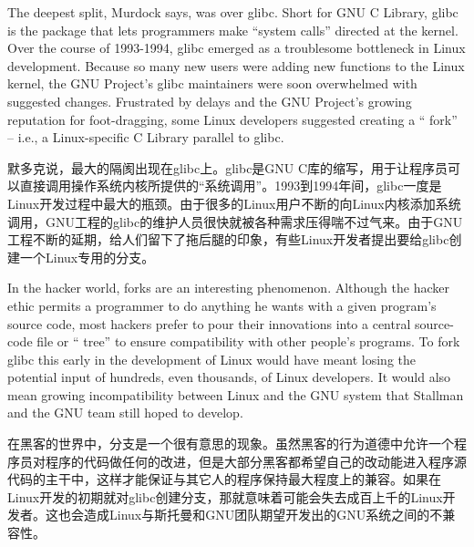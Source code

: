 
\ifdefined\eng
The deepest split, Murdock says, was over glibc. Short for GNU C Library, glibc is the package that lets programmers make ``system calls'' directed at the kernel. Over the course of 1993-1994, glibc emerged as a troublesome bottleneck in Linux development. Because so many new users were adding new functions to the Linux kernel, the GNU Project's glibc maintainers were soon overwhelmed with suggested changes. Frustrated by delays and the GNU Project's growing reputation for foot-dragging, some Linux developers suggested creating a `` fork'' -- i.e., a Linux-specific C Library parallel to glibc.
\fi

\ifdefined\chs
默多克说，最大的隔阂出现在glibc上。glibc是GNU C库的缩写，用于让程序员可以直接调用操作系统内核所提供的``系统调用''。1993到1994年间，glibc一度是Linux开发过程中最大的瓶颈。由于很多的Linux用户不断的向Linux内核添加系统调用，GNU工程的glibc的维护人员很快就被各种需求压得喘不过气来。由于GNU工程不断的延期，给人们留下了拖后腿的印象，有些Linux开发者提出要给glibc创建一个Linux专用的分支。
\fi

\ifdefined\eng
In the hacker world, forks are an interesting phenomenon. Although the hacker ethic permits a programmer to do anything he wants with a given program's source code, most hackers prefer to pour their innovations into a central source-code file or `` tree'' to ensure compatibility with other people's programs. To fork glibc this early in the development of Linux would have meant losing the potential input of hundreds, even thousands, of Linux developers. It would also mean growing incompatibility between Linux and the GNU system that Stallman and the GNU team still hoped to develop.
\fi

\ifdefined\chs
在黑客的世界中，分支是一个很有意思的现象。虽然黑客的行为道德中允许一个程序员对程序的代码做任何的改进，但是大部分黑客都希望自己的改动能进入程序源代码的主干中，这样才能保证与其它人的程序保持最大程度上的兼容。如果在Linux开发的初期就对glibc创建分支，那就意味着可能会失去成百上千的Linux开发者。这也会造成Linux与斯托曼和GNU团队期望开发出的GNU系统之间的不兼容性。
\fi

